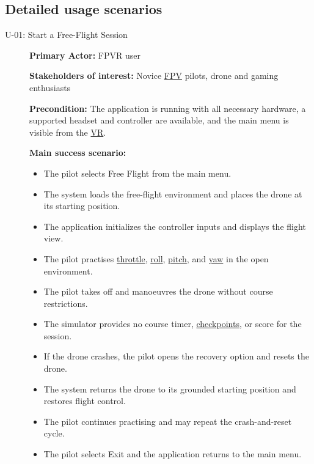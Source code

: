 \documentclass[12pt]{article}
\begin{document}
\subsection{Detailed usage scenarios}\label{s4}


\begin{description}
\item[U-01: Start a Free-Flight Session]\mbox{}

\textbf{Primary Actor:} FPVR user

\textbf{Stakeholders of interest:} Novice \hyperlink{glos:FPV}{FPV} pilots, drone and gaming enthusiasts

\textbf{Precondition:} The application is running with all necessary hardware, a supported
headset and controller are available, and the main menu is visible from the \hyperlink{glos:VR}{VR}.

\textbf{Main success scenario:}
\begin{itemize}
\item The pilot selects Free Flight from the main menu.
\item The system loads the free-flight environment and places the drone at its
starting position.
\item The application initializes the controller inputs and displays the flight view.
\item The pilot practises \hyperlink{glos:Throttle}{throttle}, \hyperlink{glos:Throttle}{roll}, \hyperlink{glos:Throttle}{pitch}, and \hyperlink{glos:Throttle}{yaw} in the open
environment.
\item The pilot takes off and manoeuvres the drone without course
restrictions.
\item The simulator provides no course timer, \hyperlink{glos:Checkpoint}{checkpoints}, or score for the session.
\item If the drone crashes, the pilot opens the recovery option and resets the
drone.
\item The system returns the drone to its grounded starting position and restores
flight control.
\item The pilot continues practising and may repeat the crash-and-reset cycle.
\item The pilot selects Exit and the application returns to the main menu.
\end{itemize}


\end{description}
\end{document}

